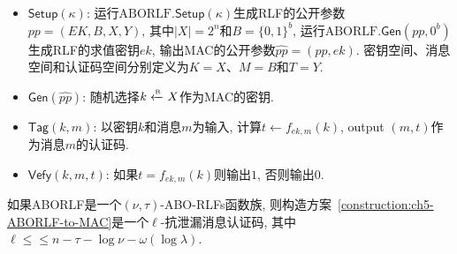 \begin{construction}\label{construction:ch5-ABORLF-to-MAC}
\begin{itemize} \itemsep 1pt \parskip 0pt \parsep 0pt
\item $\mathsf{Setup}(\kappa)$: 运行$\text{ABORLF}.\mathsf{Setup}(\kappa)$生成RLF的公开参数$pp = (EK, B, X, Y)$, 其中$|X| = 2^n$和$B = \{0,1\}^b$, 运行$\text{ABORLF}.\mathsf{Gen}(pp, 0^b)$生成RLF的求值密钥$ek$, 输出MAC的公开参数$\hat{pp} = (pp, ek)$. 密钥空间、消息空间和认证码空间分别定义为$K = X$、$M = B$和$T = Y$. 

\item $\mathsf{Gen}(\hat{pp})$: 随机选择$k \xleftarrow{\textup{\tiny R}} X$作为MAC的密钥. 

\item $\mathsf{Tag}(k, m)$: 以密钥$k$和消息$m$为输入, 计算$t \leftarrow f_{ek, m}(k)$, output $(m, t)$作为消息$m$的认证码. 

\item $\mathsf{Vefy}(k, m, t)$: 如果$t = f_{ek,m}(k)$则输出$1$, 否则输出$0$. 
\end{itemize}
\end{construction}

\begin{theorem}\label{theorem:ch5-ABORLF-to-MAC}
如果ABORLF是一个$(\nu, \tau)$-ABO-RLFs函数族, 则构造方案~\ref{construction:ch5-ABORLF-to-MAC}是一个$\ell$-抗泄漏消息认证码, 其中$\ell \leq \leq n - \tau - \log \nu - \omega(\log \lambda)$. 
\end{theorem}


